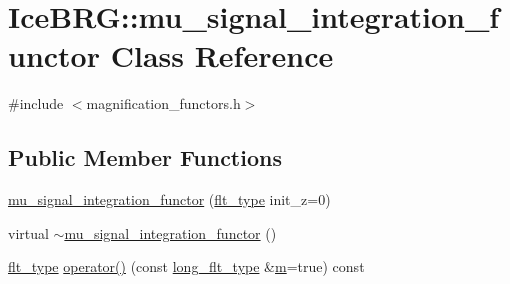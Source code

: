 \hypertarget{classIceBRG_1_1mu__signal__integration__functor}{\section{Ice\-B\-R\-G\-:\-:mu\-\_\-signal\-\_\-integration\-\_\-functor Class Reference}
\label{classIceBRG_1_1mu__signal__integration__functor}
}


{\ttfamily \#include $<$magnification\-\_\-functors.\-h$>$}

\subsection*{Public Member Functions}
\begin{DoxyCompactItemize}
\item 
\hyperlink{classIceBRG_1_1mu__signal__integration__functor_adcf7391f693e91147be3556c3d7a0cd0}{mu\-\_\-signal\-\_\-integration\-\_\-functor} (\hyperlink{lib_2IceBRG__main_2common_8h_ad0f130a56eeb944d9ef2692ee881ecc4}{flt\-\_\-type} init\-\_\-z=0)
\item 
virtual \hyperlink{classIceBRG_1_1mu__signal__integration__functor_ab688531f79c3c3f8e3946e6bff1079ed}{$\sim$mu\-\_\-signal\-\_\-integration\-\_\-functor} ()
\item 
\hyperlink{lib_2IceBRG__main_2common_8h_ad0f130a56eeb944d9ef2692ee881ecc4}{flt\-\_\-type} \hyperlink{classIceBRG_1_1mu__signal__integration__functor_ad30a82f71d64b7d7141e6a3ffc2e6377}{operator()} (const \hyperlink{lib_2IceBRG__main_2common_8h_a7040956e7e1b504d34a9ccfb4253bdce}{long\-\_\-flt\-\_\-type} \&\hyperlink{namespaceIceBRG_ada6365c5d16106f0608afbd34f010bcc}{m}=true) const 
\end{DoxyCompactItemize}


